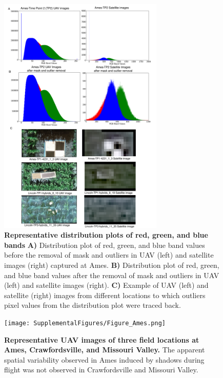 \documentclass[12pt,twoside]{gsag3jnl}
\begin{document}
\begin{figure}[h!]
\centering
\includegraphics[width=0.7\textwidth]{SupplementalFigures/Supplementary1.png}
\caption{\textbf{Representative distribution plots of red, green, and blue bands} \textbf{A)} Distribution plot of red, green, and blue band values before the removal of mask and outliers in UAV (left) and satellite images (right) captured at Ames. \textbf{B)} Distribution plot of red, green, and blue band values after the removal of mask and outliers in UAV (left) and satellite images (right).
\textbf{C)} Example of UAV (left) and satellite (right) images from different locations to which outliers pixel values from the distribution plot were traced back.}
\label{fig:outlier}
\end{figure}

\begin{figure}[h!]
\centering
\texttt{[image: SupplementalFigures/Figure\_Ames.png]}
\caption{\textbf{Representative UAV images of three field locations at Ames, Crawfordsville, and Missouri Valley.} The apparent spatial variability observed in Ames induced by shadows during flight was not observed in Crawfordsville and Missouri Valley.}
\label{fig:Ames}
\end{figure}
\end{document}
